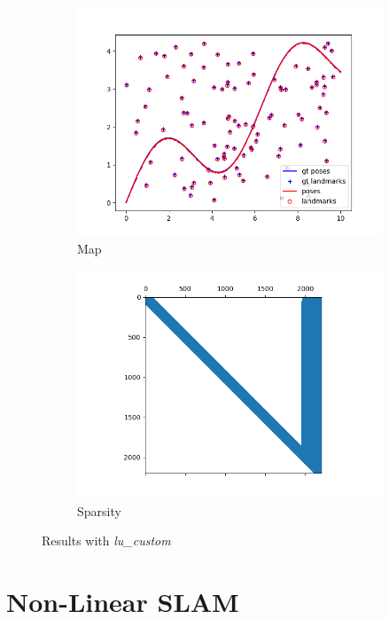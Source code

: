 \documentclass[12pt, a4paper]{article}
\begin{document}
\begin{figure}[H]
  \centering
  \begin{subfigure}[b]{0.45\textwidth}
    \includegraphics[width=\textwidth]{./results/linear/lu_custom_2d_linear_map.png}
    \caption{Map}
  \end{subfigure}
  \hfill
  \begin{subfigure}[b]{0.45\textwidth}
    \includegraphics[width=\textwidth]{./results/linear/lu_custom_2d_linear_sparsity.png}
    \caption{Sparsity}
  \end{subfigure}
  \caption{Results with \textit{lu\_custom}}
  \end{figure}
\section{Non-Linear SLAM}
\end{document}
